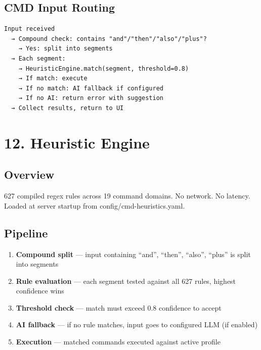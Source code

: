 \documentclass[11pt, a4paper, DIV=14]{scrartcl}
\renewcommand{\texttt}[1]{{\ttfamily\fontsize{8.5}{10.5}\selectfont\color{BabbNavy}#1}}
\let\origRule\rule
\renewcommand{\rule}[2]{\par\vspace{2pt}\noindent{\color{BabbBorder}\origRule[0pt]{#1}{#2}}\par\vspace{2pt}}
\begin{document}
\subsection{CMD Input Routing}\label{cmd-input-routing}

\begin{verbatim}
Input received
  → Compound check: contains "and"/"then"/"also"/"plus"?
    → Yes: split into segments
  → Each segment:
    → HeuristicEngine.match(segment, threshold=0.8)
    → If match: execute
    → If no match: AI fallback if configured
    → If no AI: return error with suggestion
  → Collect results, return to UI
\end{verbatim}

\begin{center}\rule{0.5\linewidth}{0.5pt}\end{center}

\section{12. Heuristic Engine}\label{heuristic-engine}

\subsection{Overview}\label{overview-2}

627 compiled regex rules across 19 command domains. No network. No
latency. Loaded at server startup from
\texttt{config/cmd-heuristics.yaml}.

\subsection{Pipeline}\label{pipeline}

\begin{enumerate}
\def\labelenumi{\arabic{enumi}.}
\tightlist
\item
  \textbf{Compound split} --- input containing ``and'', ``then'',
  ``also'', ``plus'' is split into segments
\item
  \textbf{Rule evaluation} --- each segment tested against all 627
  rules, highest confidence wins
\item
  \textbf{Threshold check} --- match must exceed 0.8 confidence to
  accept
\item
  \textbf{AI fallback} --- if no rule matches, input goes to configured
  LLM (if enabled)
\item
  \textbf{Execution} --- matched commands executed against active
  profile
\end{enumerate}
\end{document}
